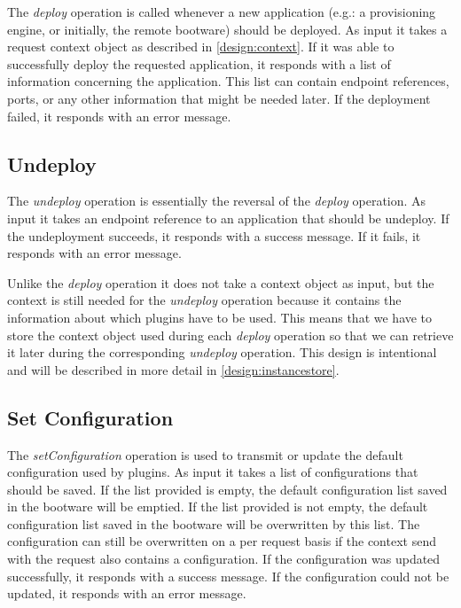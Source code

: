 The \textit{deploy} operation is called whenever a new application (e.g.: a provisioning engine, or initially, the remote bootware) should be deployed.
As input it takes a request context object as described in \autoref{design:context}.
If it was able to successfully deploy the requested application, it responds with a list of information concerning the application.
This list can contain endpoint references, ports, or any other information that might be needed later.
If the deployment failed, it responds with an error message.

\subsection{Undeploy}

The \textit{undeploy} operation is essentially the reversal of the \textit{deploy} operation.
As input it takes an endpoint reference to an application that should be undeploy.
If the undeployment succeeds, it responds with a success message.
If it fails, it responds with an error message.

Unlike the \textit{deploy} operation it does not take a context object as input, but the context is still needed for the \textit{undeploy} operation because it contains the information about which plugins have to be used.
This means that we have to store the context object used during each \textit{deploy} operation so that we can retrieve it later during the corresponding \textit{undeploy} operation.
This design is intentional and will be described in more detail in \autoref{design:instancestore}.

\subsection{Set Configuration}

The \textit{setConfiguration} operation is used to transmit or update the default configuration used by plugins.
As input it takes a list of configurations that should be saved.
If the list provided is empty, the default configuration list saved in the bootware will be emptied.
If the list provided is not empty, the default configuration list saved in the bootware will be overwritten by this list.
The configuration can still be overwritten on a per request basis if the context send with the request also contains a configuration.
If the configuration was updated successfully, it responds with a success message.
If the configuration could not be updated, it responds with an error message.

